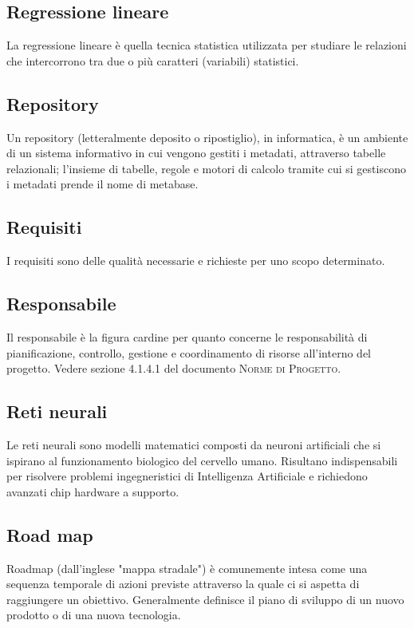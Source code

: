 
\subsection*{Regressione lineare}
La regressione lineare è quella tecnica statistica utilizzata per studiare le relazioni che intercorrono tra due o più caratteri (variabili) statistici.

\subsection*{Repository}
Un repository (letteralmente deposito o ripostiglio), in informatica, è un ambiente di un sistema informativo  in cui vengono gestiti i metadati, attraverso tabelle relazionali; l'insieme di tabelle, regole e motori di calcolo tramite cui si gestiscono i metadati prende il nome di metabase.

\subsection*{Requisiti}
I requisiti sono delle qualità necessarie e richieste per uno scopo determinato.

\subsection*{Responsabile}
Il responsabile è la figura cardine per quanto concerne le responsabilità di pianificazione, controllo, gestione e coordinamento di risorse all’interno del progetto. Vedere sezione 4.1.4.1 del documento \textsc{Norme di Progetto}.

\subsection*{Reti neurali}
Le reti neurali sono modelli matematici composti da neuroni artificiali che si ispirano al funzionamento biologico del cervello umano. 
Risultano indispensabili per risolvere problemi ingegneristici di Intelligenza Artificiale e richiedono avanzati chip hardware a supporto.

\subsection*{Road map}
Roadmap (dall'inglese "mappa stradale") è comunemente intesa come una sequenza temporale di azioni previste attraverso la quale ci si aspetta di raggiungere un obiettivo. Generalmente definisce il piano di sviluppo di un nuovo prodotto o di una nuova tecnologia.

